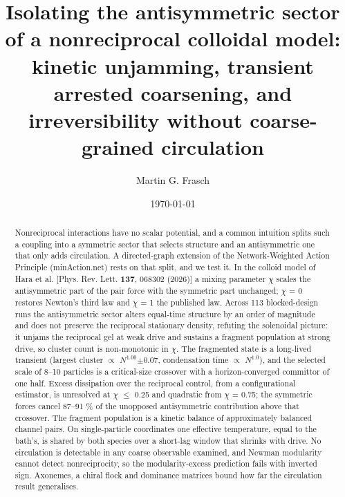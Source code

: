 \documentclass[aps,pre,preprint,superscriptaddress,nofootinbib,longbibliography]{revtex4-2}
\begin{document}
\title{Isolating the antisymmetric sector of a nonreciprocal colloidal model:
kinetic unjamming, transient arrested coarsening, and irreversibility
without coarse-grained circulation}

\author{Martin G. Frasch}

\date{\today}

\begin{abstract}
Nonreciprocal interactions have no scalar potential, and a common intuition splits such a coupling into a symmetric sector that selects structure and an antisymmetric one that only adds circulation. A directed-graph extension of the Network-Weighted Action Principle (minAction.net) rests on that split, and we test it. In the colloid model of Hara et al. [Phys. Rev. Lett. \textbf{137}, 068302 (2026)] a mixing parameter $\chi$ scales the antisymmetric part of the pair force with the symmetric part unchanged; $\chi$ = 0 restores Newton's third law and $\chi$ = 1 the published law. Across 113 blocked-design runs the antisymmetric sector alters equal-time structure by an order of magnitude and does not preserve the reciprocal stationary density, refuting the solenoidal picture: it unjams the reciprocal gel at weak drive and sustains a fragment population at strong drive, so cluster count is non-monotonic in $\chi$. The fragmented state is a long-lived transient (largest cluster $\propto$ $N^{1.00}$$\pm$0.07, condensation time $\propto$ $N^{1.0}$), and the selected scale of 8--10 particles is a critical-size crossover with a horizon-converged committor of one half. Excess dissipation over the reciprocal control, from a configurational estimator, is unresolved at $\chi$ $\le$ 0.25 and quadratic from $\chi$ = 0.75; the symmetric forces cancel 87--91 \% of the unopposed antisymmetric contribution above that crossover. The fragment population is a kinetic balance of approximately balanced channel pairs. On single-particle coordinates one effective temperature, equal to the bath's, is shared by both species over a short-lag window that shrinks with drive. No circulation is detectable in any coarse observable examined, and Newman modularity cannot detect nonreciprocity, so the modularity-excess prediction fails with inverted sign. Axonemes, a chiral flock and dominance matrices bound how far the circulation result generalises.
\end{abstract}
\end{document}
